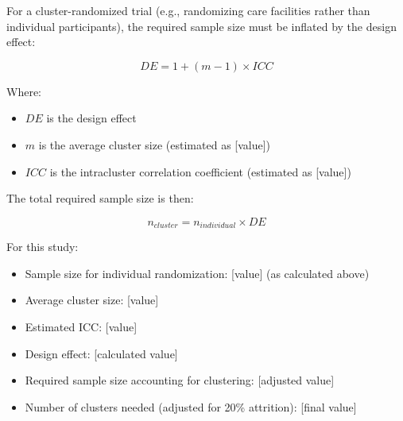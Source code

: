 \begin{tcolorbox}[title=Sample Size Calculation for Cluster-Randomized Trial]
For a cluster-randomized trial (e.g., randomizing care facilities rather than individual participants), the required sample size must be inflated by the design effect:

\begin{equation}
DE = 1 + (m - 1) \times ICC
\end{equation}

Where:
\begin{itemize}
    \item $DE$ is the design effect
    \item $m$ is the average cluster size (estimated as [value])
    \item $ICC$ is the intracluster correlation coefficient (estimated as [value])
\end{itemize}

The total required sample size is then:

\begin{equation}
n_{cluster} = n_{individual} \times DE
\end{equation}

For this study:
\begin{itemize}
    \item Sample size for individual randomization: [value] (as calculated above)
    \item Average cluster size: [value]
    \item Estimated ICC: [value]
    \item Design effect: [calculated value]
    \item Required sample size accounting for clustering: [adjusted value]
    \item Number of clusters needed (adjusted for 20\% attrition): [final value]
\end{itemize}
\end{tcolorbox}